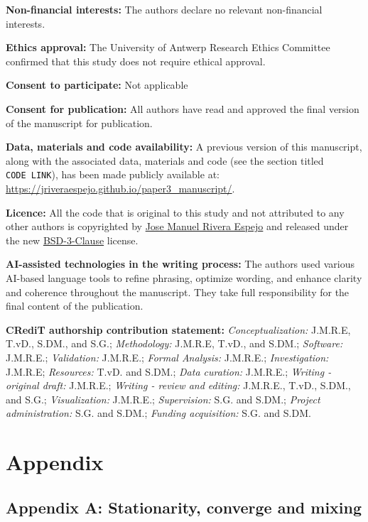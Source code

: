 \documentclass[
  authoryear,
  review,
  1p]{elsarticle}
\begin{document}
\textbf{Non-financial interests:} The authors declare no relevant
non-financial interests.

\textbf{Ethics approval:} The University of Antwerp Research Ethics
Committee confirmed that this study does not require ethical approval.

\textbf{Consent to participate:} Not applicable

\textbf{Consent for publication:} All authors have read and approved the
final version of the manuscript for publication.

\textbf{Data, materials and code availability:} A previous version of
this manuscript, along with the associated data, materials and code (see
the section titled \texttt{CODE\ LINK}), has been made publicly
available at: \url{https://jriveraespejo.github.io/paper3_manuscript/}.

\textbf{Licence:} All the code that is original to this study and not
attributed to any other authors is copyrighted by
\href{https://orcid.org/0000-0002-3088-2783}{Jose Manuel Rivera Espejo}
and released under the new
\href{https://opensource.org/license/BSD-3-Clause}{BSD-3-Clause}
license.

\textbf{AI-assisted technologies in the writing process:} The authors
used various AI-based language tools to refine phrasing, optimize
wording, and enhance clarity and coherence throughout the manuscript.
They take full responsibility for the final content of the publication.

\textbf{CRediT authorship contribution statement:}
\emph{Conceptualization:} J.M.R.E, T.vD., S.DM., and S.G.;
\emph{Methodology:} J.M.R.E, T.vD., and S.DM.; \emph{Software:}
J.M.R.E.; \emph{Validation:} J.M.R.E.; \emph{Formal Analysis:} J.M.R.E.;
\emph{Investigation:} J.M.R.E; \emph{Resources:} T.vD. and S.DM.;
\emph{Data curation:} J.M.R.E.; \emph{Writing - original draft:}
J.M.R.E.; \emph{Writing - review and editing:} J.M.R.E., T.vD., S.DM.,
and S.G.; \emph{Visualization:} J.M.R.E.; \emph{Supervision:} S.G. and
S.DM.; \emph{Project administration:} S.G. and S.DM.; \emph{Funding
acquisition:} S.G. and S.DM.

\newpage{}

\section{Appendix}\label{sec-appendix}

\subsection{Appendix A: Stationarity, converge and
mixing}\label{sec-appendixA}
\end{document}
